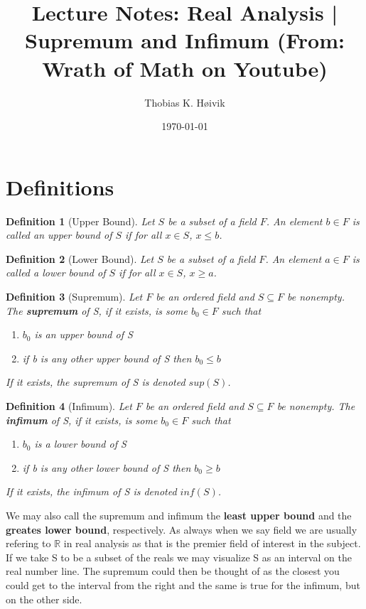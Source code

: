 \documentclass[12pt]{article}
\title{Lecture Notes: Real Analysis | Supremum and Infimum (From: Wrath of Math on Youtube)}
\author{Thobias K. Høivik}
\date{\today}
\newtheorem{definition}{Definition}
\begin{document}
\maketitle
\section*{Definitions}
\begin{definition}[Upper Bound]
    Let \( S \) be a subset of a field \( F \). 
    An element \( b \in F \) is called an \textit{upper bound} 
    of \( S \) if for all \( x \in S \), \( x \leq b \).
\end{definition}

\begin{definition}[Lower Bound]
    Let \( S \) be a subset of a field \( F \). 
    An element \( a \in F \) is called a \textit{lower bound} of 
    \( S \) if for all \( x \in S \), \( x \geq a \).
\end{definition}

\begin{definition}[Supremum]
    Let \(F\) be an ordered field and \(S \subseteq F\) be nonempty.
    The \textbf{supremum} of S, if it exists, is some \(b_0 \in F\) 
    such that 
    \begin{enumerate}
        \item \(b_0\) is an upper bound of S 
        \item if b is any other upper bound of S then \(b_0 \leq b\)
    \end{enumerate}
    If it exists, the supremum of S is denoted \(sup(S)\).
    
\end{definition}
\begin{definition}[Infimum]
    Let \(F\) be an ordered field and \(S \subseteq F\) be nonempty.
    The \textbf{infimum} of S, if it exists, is some \(b_0 \in F\) 
    such that 
    \begin{enumerate}
        \item \(b_0\) is a lower bound of S 
        \item if b is any other lower bound of S then \(b_0 \geq b\)
    \end{enumerate}
    If it exists, the infimum of S is denoted \(inf(S)\).
    
\end{definition}

\noindent 
We may also call the supremum and infimum the \textbf{least upper bound} and 
the \textbf{greates lower bound}, respectively.
As always when we say field we are usually refering to \(\mathbb R\) in real 
analysis as that is the premier field of interest in the subject.
If we take S to be a subset of the reals we may visualize S as an interval 
on the real number line. The supremum could then be thought of as 
the closest you could get to the interval from the right
and the same is true for the infimum, but on the other side.
\end{document}
